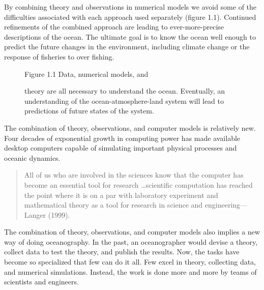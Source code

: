 By combining theory and observations in numerical models we avoid some
of the difficulties associated with each approach used separately
(figure 1.1). Continued refinements of the combined approach are
leading to ever-more-precise descriptions of the ocean. The ultimate
goal is to know the ocean well enough to predict the future changes in
the environment, including climate change or the response of fisheries
to over fishing.

\begin{figure}[h!]
\footnotesize
Figure 1.1 Data, numerical models, and \rule{0mm}{4ex}theory are
all necessary to understand the ocean. Eventually, an
understanding of the ocean-atmosphere-land system will lead to
predictions of future states of the system.

\label{fig:bigpicture}
\vspace{-1ex}
\end{figure}

The combination of theory, observations, and computer
models is relatively new. Four decades of
exponential growth in computing power has made available desktop
computers capable of simulating important physical processes and
oceanic dynamics.
\begin{quote} \small
All of us who are involved in the sciences know that the computer has
become an essential tool for research \dots scientific computation has
reached the point where it is on a par with laboratory experiment and
mathematical theory as a tool for research in science and
engineering---Langer (1999).
\end{quote}

The combination of theory, observations, and computer models also
implies a new way of doing oceanography.
In the past, an oceanographer would devise a theory, collect
data to test the theory, and publish the results. Now, the tasks have
become so specialized that few can do it all. Few excel in theory,
collecting data, and numerical simulations. Instead, the work is done
more and more by teams of scientists and engineers.

